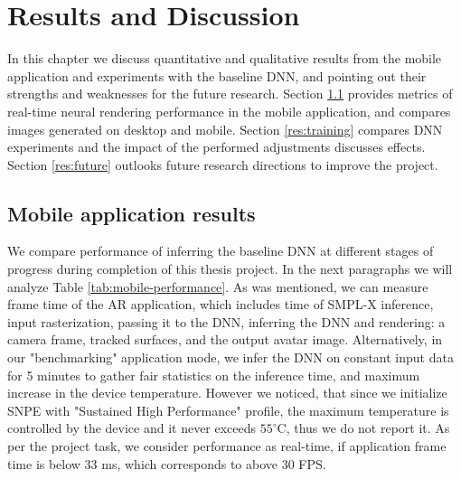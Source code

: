 \chapter{Results and Discussion}\label{chapter:res}
In this chapter we discuss quantitative and qualitative results from the mobile application and experiments with the baseline DNN, and pointing out their strengths and weaknesses for the future research. Section \ref{res:performance} provides metrics of real-time neural rendering performance in the mobile application, and compares images  generated on desktop and mobile. Section \ref{res:training} compares DNN experiments and the impact of the performed adjustments discusses effects. Section \ref{res:future} outlooks future research directions to improve the project.

\section{Mobile application results}\label{res:performance}

We compare performance of inferring the baseline DNN at different stages of progress during completion of this thesis project. In the next paragraphs we will analyze Table \ref{tab:mobile-performance}. As was mentioned, we can measure frame time of the AR application, which includes time of SMPL-X inference, input rasterization, passing it to the DNN, inferring the DNN and rendering: a camera frame, tracked surfaces, and the output avatar image. Alternatively, in our "benchmarking" application mode, we infer the DNN on constant input data for 5 minutes to gather fair statistics on the inference time, and maximum increase in the device temperature. However we noticed, that since we initialize SNPE with "Sustained High Performance" profile, the maximum temperature is controlled by the device and it never exceeds $55^\circ$C, thus we do not report it. As per the project task, we consider performance as real-time, if application frame time is below 33 ms, which corresponds to above 30 FPS.

